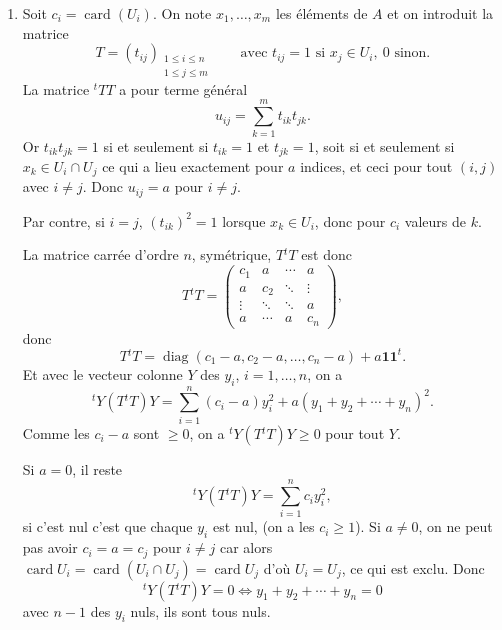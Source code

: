 \begin{enumerate}[label=\arabic*.,leftmargin=2.2em,itemsep=1.2em]
On suppose le résultat vrai jusqu'à l'ordre $\alpha$ : on a donc
\[
(1+p)^{p^\alpha}=1+p^{\alpha+1}+kp^{\alpha+2}\qquad\text{avec }k\in\mathbb N.
\]
On en déduit
\begin{align*}
(1+p)^{p^{\alpha+1}}
&=\bigl((1+p)^{p^\alpha}\bigr)^p\\
&=(1+p^{\alpha+1}+kp^{\alpha+2})^p\\
&=1+p(p^{\alpha+1}+kp^{\alpha+2})
+\sum_{r=2}^{p}\binom pr(p^{\alpha+1}+kp^{\alpha+2})^r.
\end{align*}
Pour $r\ge2$, $\binom pr$ est divisible par $p$, $(p^{\alpha+1}+kp^{\alpha+2})^r$ par $p^{2\alpha+2}$ donc chaque
\[
\binom pr(p^{\alpha+1}+kp^{\alpha+2})^r
\]
par $p^{2\alpha+3}$, et a fortiori par $p^{\alpha+3}$. On a donc
\[
(1+p)^{p^{\alpha+1}}=1+p^{\alpha+2}+kp^{\alpha+3}+\text{multiple de }p^{\alpha+3},
\]
d'où
\[
(1+p)^{p^{\alpha+1}}\equiv1+p^{\alpha+2}\pmod{p^{\alpha+3}},
\]
c'est le résultat à l'ordre $\alpha+1$.

\item Soit $c_i=\operatorname{card}(U_i)$. On note $x_1,\ldots,x_m$ les éléments de $A$ et on introduit la matrice
\[
T=(t_{ij})_{\substack{1\le i\le n\\1\le j\le m}}
\qquad\text{avec }t_{ij}=1\text{ si }x_j\in U_i,\ 0\text{ sinon.}
\]
La matrice ${}^tTT$ a pour terme général
\[
u_{ij}=\sum_{k=1}^{m}t_{ik}t_{jk}.
\]
Or $t_{ik}t_{jk}=1$ si et seulement si $t_{ik}=1$ et $t_{jk}=1$, soit si et seulement si $x_k\in U_i\cap U_j$ ce qui a lieu exactement pour $a$ indices, et ceci pour tout $(i,j)$ avec $i\ne j$. Donc $u_{ij}=a$ pour $i\ne j$.

Par contre, si $i=j$, $(t_{ik})^2=1$ lorsque $x_k\in U_i$, donc pour $c_i$ valeurs de $k$.

La matrice carrée d'ordre $n$, symétrique, $T{}^tT$ est donc
\[
T{}^tT=
\begin{pmatrix}
c_1 & a & \cdots & a \\
a & c_2 & \ddots & \vdots \\
\vdots & \ddots & \ddots & a \\
a & \cdots & a & c_n
\end{pmatrix},
\]
donc
\[
T{}^tT=\operatorname{diag}(c_1-a,c_2-a,\ldots,c_n-a)+a\mathbf 1\mathbf 1^t.
\]
Et avec le vecteur colonne $Y$ des $y_i$, $i=1,\ldots,n$, on a
\[
{}^tY(T{}^tT)Y=\sum_{i=1}^{n}(c_i-a)y_i^2+a(y_1+y_2+\cdots+y_n)^2.
\]
Comme les $c_i-a$ sont $\ge0$, on a ${}^tY(T{}^tT)Y\ge0$ pour tout $Y$.

Si $a=0$, il reste
\[
{}^tY(T{}^tT)Y=\sum_{i=1}^{n}c_i y_i^2,
\]
si c'est nul c'est que chaque $y_i$ est nul, (on a les $c_i\ge1$). Si $a\ne0$, on ne peut pas avoir $c_i=a=c_j$ pour $i\ne j$ car alors $\operatorname{card}U_i=\operatorname{card}(U_i\cap U_j)=\operatorname{card}U_j$ d'où $U_i=U_j$, ce qui est exclu. Donc
\[
{}^tY(T{}^tT)Y=0\Leftrightarrow y_1+y_2+\cdots+y_n=0
\]
avec $n-1$ des $y_i$ nuls, ils sont tous nuls.


\end{enumerate}
